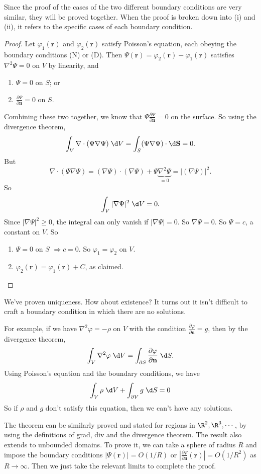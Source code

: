 \documentclass[a4paper]{article}
\begin{document}
Since the proof of the cases of the two different boundary conditions are very similar, they will be proved together. When the proof is broken down into (i) and (ii), it refers to the specific cases of each boundary condition.
\begin{proof}
  Let $\varphi_1(\mathbf{r})$ and $\varphi_2(\mathbf{r})$ satisfy Poisson's equation, each obeying the boundary conditions (N) or (D). Then $\Psi(\mathbf{r}) = \varphi_2(\mathbf{r}) - \varphi_1(\mathbf{r})$ satisfies $\nabla^2\Psi = 0$ on $V$ by linearity, and
  \begin{enumerate}
    \item $\Psi = 0$ on $S$; or
    \item $\frac{\partial \Psi}{\partial \mathbf{n}} = 0$ on $S$.
  \end{enumerate}
  Combining these two together, we know that $\Psi\frac{\partial \Psi}{\partial \mathbf{n}} = 0$ on the surface. So using the divergence theorem,
  \[
    \int_V \nabla\cdot (\Psi\nabla \Psi) \;\d V = \int_S (\Psi\nabla\Psi)\cdot \d \mathbf{S} = 0.
  \]
  But
  \[
    \nabla\cdot(\Psi\nabla \Psi) = (\nabla\Psi)\cdot (\nabla\Psi) + \Psi\underbrace{\nabla^2\Psi}_{=0} = |(\nabla\Psi)|^2.
  \]
  So
  \[
    \int_V |\nabla \Psi|^2\;\d V = 0.
  \]
  Since $|\nabla\Psi|^2 \geq 0$, the integral can only vanish if $|\nabla \Psi| = 0$. So $\nabla\Psi = 0$. So $\Psi = c$, a constant on $V$. So
  \begin{enumerate}
    \item $\Psi = 0$ on $S$ $\Rightarrow c = 0$. So $\varphi_1 = \varphi_2$ on $V$.
    \item $\varphi_2(\mathbf{r}) = \varphi_1(\mathbf{r}) + C$, as claimed.\qedhere
  \end{enumerate}
\end{proof}
We've proven uniqueness. How about existence? It turns out it isn't difficult to craft a boundary condition in which there are no solutions.

For example, if we have $\nabla^2 \varphi = -\rho$ on $V$ with the condition $\frac{\partial \varphi}{\partial \mathbf{n}} = g$, then by the divergence theorem,
\[
  \int_V \nabla^2\varphi \;\d V = \int_{\partial S} \frac{\partial \varphi}{\partial \mathbf{n}}\;\d S.
\]
Using Poisson's equation and the boundary conditions, we have
\[
  \int_V \rho \;\d V + \int_{\partial V} g\;\d S = 0
\]
So if $\rho$ and $g$ don't satisfy this equation, then we can't have any solutions.

The theorem can be similarly proved and stated for regions in $\R^2, \R^3, \cdots$, by using the definitions of grad, div and the divergence theorem. The result also extends to unbounded domains. To prove it, we can take a sphere of radius $R$ and impose the boundary conditions $|\Psi(\mathbf{r})| = O(1/R)$ or $|\frac{\partial \Psi}{\partial \mathbf{n}}(\mathbf{r})| = O(1/R^2)$ as $R\to \infty$. Then we just take the relevant limits to complete the proof.
\end{document}
